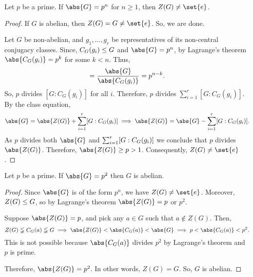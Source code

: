 \documentclass[11pt]{penrose}
\begin{document}
\begin{nthm}
    Let $p$ be a prime. If $\abs{G} = p^{n}$ for $n \geq 1$, then $Z(G) \neq \set{e}$.
\end{nthm}
\begin{proof}
    If $G$ is abelian, then $Z(G) = G \neq \set{e}$. So, we are done.

    Let $G$ be non-abelian, and $g_{1}, \dots, g_{r}$ be representatives of its non-central conjugacy classes. Since, $C_{G}(g_{i}) \mathrel{\leq} G$ and $\abs{G} = p^{n}$, by Lagrange's theorem $\abs{C_{G}(g_{i})} = p^{k}$ for some $k < n$. Thus,
    \begin{equation*}
        [G : C_{G}(g_{i})] = \frac{\abs{G}}{\abs{C_{G}(g_{i})}} = p^{n-k}.
    \end{equation*}
    So, $p$ divides $[G : C_{G}(g_{i})]$ for all $i$. Therefore, $p$ divides $\sum_{i=1}^{r} [G : C_{G}(g_{i})]$. By the class equation,
    \begin{equation*}
        \abs{G} = \abs{Z(G)} + \sum_{i=1}^{r} \comm{G : C_{G}(g_{i})}
        \implies
        \abs{Z(G)} = \abs{G} - \sum_{i=1}^{r} \comm{G : C_{G}(g_{i})}.
    \end{equation*}
    As $p$ divides both $\abs{G}$ and $\sum_{i=1}^{r} \lbrack G : C_{G}(g_{i})\rbrack$ we conclude that $p$ divides $\abs{Z(G)}$. Therefore, $\abs{Z(G)} \geq p > 1$. Consequently, $Z(G) \neq \set{e}$.
\end{proof}

\begin{ncor}
    Let $p$ be a prime. If $\abs{G} = p^{2}$ then $G$ is abelian.
\end{ncor}
\begin{proof}
    Since $\abs{G}$ is of the form $p^{n}$, we have $Z(G) \neq \set{e}$. Moreover, $Z(G) \mathrel{\leq} G$, so by Lagrange's theorem $\abs{Z(G)} = p$ or $p^{2}$.

    Suppose $\abs{Z(G)} = p$, and pick any $a \in G$ such that $a \notin Z(G)$. Then,
    \begin{equation*}
        Z(G) \lneqq C_{G}(a) \lneqq G
        \implies
        \abs{Z(G)} < \abs{C_{G}(a)} < \abs{G}
        \implies
        p < \abs{C_{G}(a)} < p^{2}.
    \end{equation*}
    This is not possible because $\abs{C_{G}(a)}$ divides $p^{2}$ by Lagrange's theorem and $p$ is prime.

    Therefore, $\abs{Z(G)} = p^{2}$. In other words, $Z(G) = G$. So, $G$ is abelian.
\end{proof}
\end{document}
